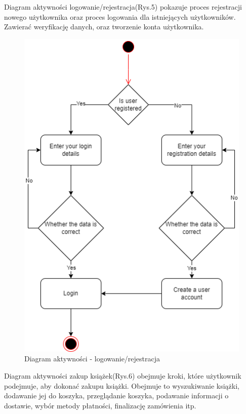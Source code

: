 \documentclass[]{article}
\begin{document}
Diagram aktywności logowanie/rejestracja(Rys.5) pokazuje proces rejestracji nowego użytkownika oraz proces logowania dla istniejących użytkowników. Zawierać weryfikację danych, oraz tworzenie konta użytkownika.
\begin{figure}[ht]
	\centering
	\includegraphics[scale=0.50]{log_rej.png}
	\caption{Diagram aktywności - logowanie/rejestracja}
\end{figure}

Diagram aktywności zakup książek(Rys.6) obejmuje kroki, które użytkownik podejmuje, aby dokonać zakupu książki. Obejmuje to wyszukiwanie książki, dodawanie jej do koszyka, przeglądanie koszyka, podawanie informacji o dostawie, wybór metody płatności, finalizację zamówienia itp.
\end{document}
